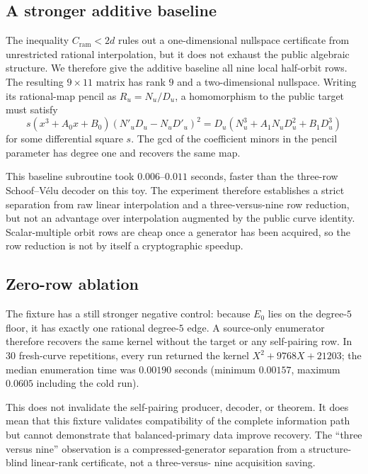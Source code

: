 \documentclass[11pt]{article}
\newcommand{\Cr}{C_{\mathrm{ram}}}
\begin{document}
\subsection{A stronger additive baseline}

The inequality $\Cr<2d$ rules out a one-dimensional nullspace certificate
from unrestricted rational interpolation, but it does not exhaust the public
algebraic structure.  We therefore give the additive baseline all nine local
half-orbit rows.  The resulting $9\times11$ matrix has rank $9$ and a
two-dimensional nullspace.  Writing its rational-map pencil as
$R_u=N_u/D_u$, a homomorphism to the public target must satisfy
\begin{equation}\label{eq:curve-identity}
 s(x^3+A_0x+B_0)(N'_uD_u-N_uD'_u)^2
 =D_u(N_u^3+A_1N_uD_u^2+B_1D_u^3)
\end{equation}
for some differential square $s$.  The gcd of the coefficient minors in the
pencil parameter has degree one and recovers the same map.

This baseline subroutine took $0.006$--$0.011$ seconds, faster than the
three-row Schoof--V\'elu decoder on this toy.  The experiment therefore establishes a
strict separation from raw linear interpolation and a three-versus-nine row
reduction, but not an advantage over interpolation augmented by the public
curve identity.  Scalar-multiple orbit rows are cheap once a generator has
been acquired, so the row reduction is not by itself a cryptographic speedup.

\subsection{Zero-row ablation}

The fixture has a still stronger negative control: because $E_0$ lies on the
degree-$5$ floor, it has exactly one rational degree-$5$ edge.  A source-only
enumerator therefore recovers the same kernel without the target or any
self-pairing row.  In 30 fresh-curve repetitions, every run returned the
kernel $X^2+9768X+21203$; the median enumeration time was $0.00190$ seconds
(minimum $0.00157$, maximum $0.0605$ including the cold run).

This does not invalidate the self-pairing producer, decoder, or theorem.  It
does mean that this fixture validates compatibility of the complete
information path but cannot demonstrate that balanced-primary data improve
recovery.  The ``three versus nine'' observation is a compressed-generator
separation from a structure-blind linear-rank certificate, not a three-versus-
nine acquisition saving.
\end{document}
